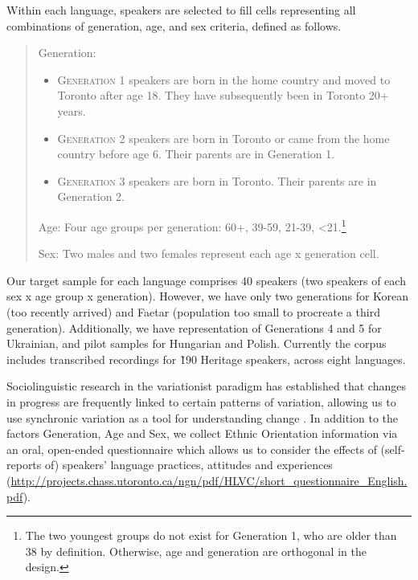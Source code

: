 \documentclass[output=paper]{LSP/langsci}
\begin{document}
Within each language, speakers are selected to fill cells representing all combinations of generation, age, and sex criteria, defined as follows. 

\begin{quote}
Generation:

\begin{itemize}
\item \textsc{Generation 1} speakers are born in the home country and moved to Toronto after age 18. They have subsequently been in Toronto 20+ years.

\item \textsc{Generation 2} speakers are born in Toronto or came from the home country before age 6. Their parents are in Generation 1.

\item \textsc{Generation 3} speakers are born in Toronto. Their parents are in Generation 2.
\end{itemize}

Age: Four age groups per generation: 60+, 39-59, 21-39, {\textless}21.\footnote{The two youngest groups do not exist for Generation 1, who are older than 38 by definition. Otherwise, age and generation are orthogonal in the design.} 

Sex: Two males and two females represent each age x generation cell.
\end{quote}

Our target sample for each language comprises 40 speakers (two speakers of each sex x age group x generation). However, we have only two generations for Korean (too recently arrived) and Faetar (population too small to procreate a third generation). Additionally, we have representation of Generations 4 and 5 for Ukrainian, and pilot samples for Hungarian and Polish. Currently the corpus includes transcribed recordings for \~190 Heritage speakers, across eight languages.

Sociolinguistic research in the variationist paradigm has established that changes in progress are frequently linked to certain patterns of variation, allowing us to use synchronic variation as a tool for understanding change \citep{bailey_apparent_1991,labov_principles_2001,labov_transmission_2007}. In addition to the factors Generation, Age and Sex, we collect Ethnic Orientation information via an oral, open-ended questionnaire which allows us to consider the effects of (self-reports of) speakers’ language practices, attitudes and experiences (\url{http://projects.chass.utoronto.ca/ngn/pdf/HLVC/short_questionnaire_English.pdf}).
\end{document}
